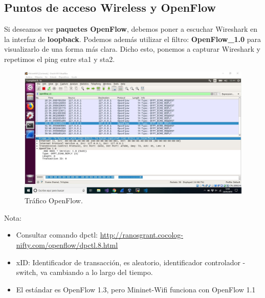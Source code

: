 \subsection{Puntos de acceso Wireless y OpenFlow}
Si deseamos ver \textbf{paquetes OpenFlow}, debemos poner a escuchar Wireshark  en la interfaz de \textbf{loopback}. Podemos además utilizar el filtro: \textbf{OpenFlow\_1.0} para visualizarlo de una forma más clara. Dicho esto, ponemos a capturar Wireshark y repetimos el ping entre sta1 y sta2.
\begin{figure}[!htb]
  \centering
    \includegraphics[width=\linewidth]{./img/7.JPG}
    \caption{Tráfico OpenFlow.}
  \label{fig:yo}
\end{figure}
\newline
Nota: 
\begin{itemize}
    \item Consultar comando dpctl: \url{http://ranosgrant.cocolog-nifty.com/openflow/dpctl.8.html}
    \item xID: Identificador de transacción, es aleatorio, identificador controlador - switch, va cambiando a lo largo del tiempo.  
    \item El estándar es OpenFlow 1.3, pero Mininet-Wifi funciona con OpenFlow 1.1
\end{itemize}

